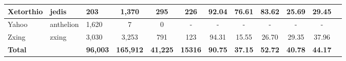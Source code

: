 \begin{table}
{\begin{tabular}{lllccccccccc}
Xetorthio                   & jedis                                                         & 203             & 1,370             & 295                                                              & 226            & 92.04          & 76.61          & 83.62          & 25.69                                                             & 29.45                                                              \\ \hline
Yahoo                       & anthelion                                                     & 1,620            & 7                & 0                                                                & -              & -              & -              & -              & -                                                                 & -                                                                  \\ \hline
Zxing                       & zxing                                                         & 3,030           & 3,253            & 791                                                              & 123            & 94.31          & 15.55          & 26.70          & 29.35                                                             & 37.96                                                              \\ \hline
\textbf{Total}              & \textbf{}                                                     & \textbf{96,003} & \textbf{165,912} & \textbf{41,225}                                                  & \textbf{15316} & \textbf{90.75} & \textbf{37.15} & \textbf{52.72} & \textbf{40.78}                                                    & \textbf{44.17}                                                     \\ \hline
\end{tabular}%
}
\end{table}